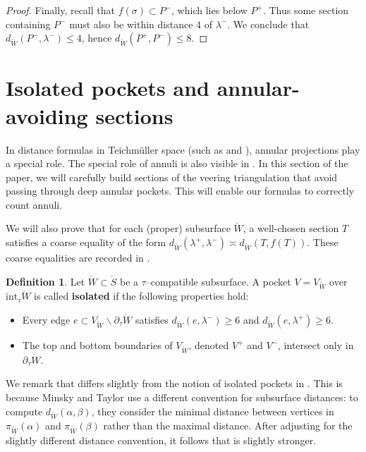 \documentclass[11pt,letterpaper]{amsart}
\newcommand{\mr}{\mathring}
\newcommand{\bdy}{\partial} %
\newcommand{\psub}{\mr W}
\numberwithin{equation}{section}
\theoremstyle{definition}
\newtheorem{definition}[theorem]{Definition}
\newcommand{\define}[1]{\textbf{#1}}
\renewcommand{\setminus}{\smallsetminus}
\renewcommand{\int}{\mathrm{int}}
\begin{document}
\begin{proof}
Finally, recall that $f(\sigma) \subset P^-$, which lies below $P^+$.
Thus some section containing $P^-$ must also be within distance $4$ of $\lambda^-$. We conclude that $d_{\psub} (P^-, \lambda^-) \leq 4$, hence $d_{\psub}(P^+, P^-) \leq 8.$
\end{proof}


\section{Isolated pockets and annular-avoiding sections}\label{sec:aas}

In distance formulas in Teichm\"uller space (such as  and ), annular projections play a special role. 
The special role of annuli is also visible in .
In this section of the paper, we will carefully build sections of the veering triangulation that avoid passing through deep annular pockets. This will enable our formulas to correctly count annuli.

We will also prove that for each (proper) subsurface $\psub$, a well-chosen section $T$ satisfies a coarse equality of the form $d_{\psub}(\lambda^+, \lambda^-) \asymp d_{\psub}(T, f(T))$. These coarse equalities are recorded in .

\begin{definition}\label{Def:IsolatedPocket}
Let $\psub \subset \mr S$ be a $\tau$--compatible subsurface. A pocket $V = V_{\psub}$ over $\int_\tau \psub$ is called \define{isolated} if the following properties hold:
\begin{itemize}
\item Every edge $e \subset V_{\psub} \setminus \bdy_\tau \psub$ satisfies $d_{\psub}(e, \lambda^-) \geq 6$ and $d_{\psub}(e, \lambda^+) \geq 6$.
\item The top and bottom boundaries of $V_{\psub}$, denoted $V^+$ and $V^-$, intersect only in $\bdy_\tau \psub$.
\end{itemize}
\end{definition}

We remark that   differs slightly from the notion of isolated pockets in \cite[Section 6.3]{MinskyTaylor:FiberedFaces}. This is because Minsky and Taylor \cite{MinskyTaylor:FiberedFaces}  use a different convention for subsurface distances: to compute $d_{\psub}(\alpha, \beta)$, they consider the minimal distance between vertices in $\pi_{\psub}(\alpha)$ and $\pi_{\psub}(\beta)$ rather than the maximal distance. After adjusting for the slightly different distance convention, it follows that  is slightly stronger.
\end{document}
